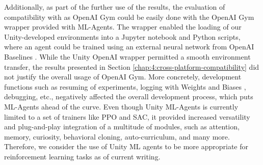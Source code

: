     Additionally, as part of the further use of the results, the evaluation of compatibility with as OpenAI Gym could be easily done with the OpenAI Gym wrapper provided with ML-Agents. The wrapper enabled the loading of our Unity-developed environments into a Jupyter notebook and Python scripts, where an agent could be trained using an external neural network from OpenAI Baselines \cite{github-dlr-rm-baselines3}.
    While the Unity OpenAI wrapper permitted a smooth environment transfer, the results presented in Section \ref{chap:4:cross-platform-compatibility} did not justify the overall usage of OpenAI Gym. 
    More concretely, development functions such as resuming of experiments, logging with Weights and Biases \cite{wandb2022}, debugging, etc., negatively affected the overall development process, which puts ML-Agents ahead of the curve. 
    Even though Unity ML-Agents is currently limited to a set of trainers like PPO and SAC, it provided increased versatility and plug-and-play integration of a multitude of modules, such as attention, memory, curiosity, behavioral cloning, auto-curriculum, and many more. Therefore, we consider the use of Unity ML agents to be more appropriate for reinforcement learning tasks as of current writing. 


  
    
    

